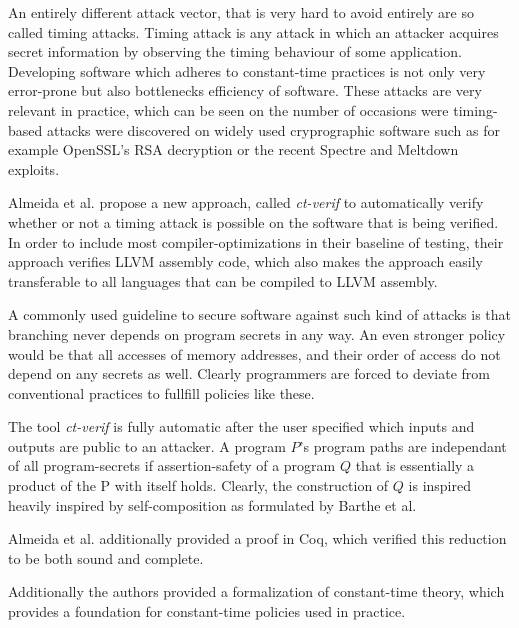 \documentclass[a4paper,UKenglish]{lipics-v2018}
\begin{document}
An entirely different attack vector, that is very hard to avoid entirely are so called timing attacks. Timing attack is any attack in which an attacker acquires secret information by observing the timing behaviour of some application. Developing software which adheres to constant-time practices is not only very error-prone but also bottlenecks efficiency of software. These attacks are very relevant in practice, which can be seen on the number of occasions were timing-based attacks were discovered on widely used cryprographic software such as for example OpenSSL's RSA decryption\cite{verifying_constant_time_implementations} or the recent Spectre and Meltdown exploits.\cite{spectre,meltdown} 


Almeida et al. propose a new approach, called \textit{ct-verif} to automatically verify whether  or not a timing attack is possible on the software that is being verified. In order to include most compiler-optimizations in their baseline of testing, their approach verifies LLVM assembly code, which also makes the approach easily transferable to all languages that can be compiled to LLVM assembly.\cite{verifying_constant_time_implementations}

A commonly used guideline to secure software against such kind of attacks is that branching never depends on program secrets in any way. An even stronger policy would be that all accesses of memory addresses, and their order of access do not depend on any secrets as well. Clearly programmers are forced to deviate from conventional practices to fullfill policies like these.\cite{verifying_constant_time_implementations}

The tool \textit{ct-verif} is fully automatic after the user specified which inputs and outputs are public to an attacker. A program $P$'s program paths are independant of all program-secrets if assertion-safety of a program $Q$ that is essentially a product of the P with itself holds.\cite{verifying_constant_time_implementations} Clearly, the construction of $Q$ is inspired heavily inspired by self-composition as formulated by Barthe et al.\cite{information_flow_by_self_composition} 

Almeida et al. additionally provided a proof in Coq, which verified this reduction to be both sound and complete.\cite{verifying_constant_time_implementations}

Additionally the authors provided a formalization of constant-time theory, which provides a foundation for constant-time policies used in practice.
\end{document}

